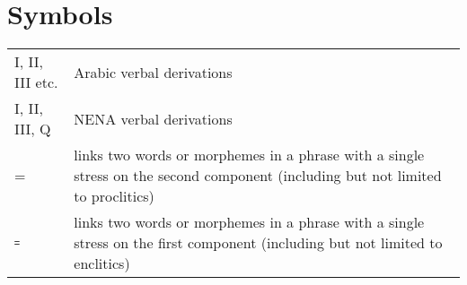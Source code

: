 \documentclass[output=paper]{langsci/langscibook}
\begin{document}
\section*{Symbols}

\begin{tabularx}{1\textwidth}{@{}lQ@{}}
I, II, III etc. & Arabic verbal derivations\\
I, II, III, Q & {NENA} verbal derivations\\
= & links two words or morphemes in a phrase with a single {stress} on the second component (including but not limited to proclitics)\\
꞊ & links two words or morphemes in a phrase with a single {stress} on the first component (including but not limited to enclitics)
\end{tabularx}%

{\sloppy\printbibliography[heading=subbibliography,notkeyword=this]}
\end{document}
